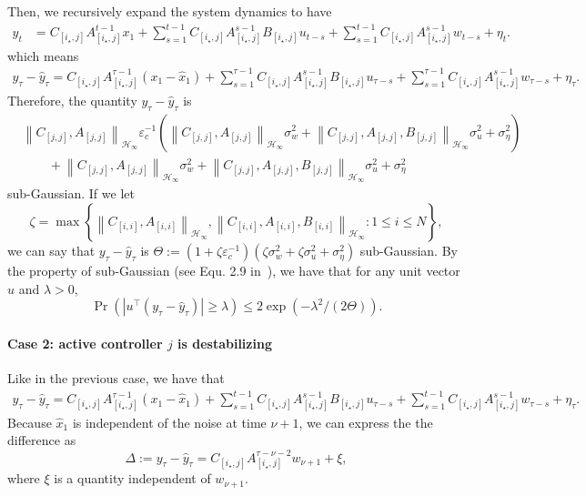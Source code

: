\documentclass[11pt, twoside]{article}
\theoremstyle{definition}
\newcommand{\norm}[1]{\left\lVert #1 \right\rVert}
\newcommand{\hinfnorm}[1]{\norm{#1}_{\mathcal{H}_\infty}}
\begin{document}
Then, we recursively expand the system dynamics to have
\begin{align*}
    y_t
    &= C_{[i_\star, j]} A_{[i_\star, j]}^{t-1} x_{1} + \sum_{s=1}^{t-1} C_{[i_\star, j]} A_{[i_\star, j]}^{s-1} B_{[i_\star, j]} u_{t-s} + \sum_{s=1}^{t-1} C_{[i_\star, j]} A_{[i_\star, j]}^{s-1} w_{t-s} + \eta_t.
\end{align*}
which means
\begin{align*} 
    y_{\tau} - \hat{y}_{\tau} = C_{[i_\star, j]} A_{[i_\star, j]}^{\tau-1} (x_{1} - \hat{x}_1) + \sum_{s=1}^{\tau-1} C_{[i_\star, j]} A_{[i_\star, j]}^{s-1} B_{[i_\star, j]} u_{\tau-s} + \sum_{s=1}^{\tau-1} C_{[i_\star, j]} A_{[i_\star, j]}^{s-1} w_{\tau-s} + \eta_\tau.
\end{align*}
Therefore, the quantity $y_{\tau} - \hat{y}_{\tau}$ is 
\begin{align*} 
    &\hinfnorm{C_{[j,j]}, A_{[j,j]}} \varepsilon_c^{-1}\left(\hinfnorm{C_{[j,j]}, A_{[j,j]}}\sigma_w^2 + \hinfnorm{C_{[j,j]}, A_{[j,j]}, B_{[j,j]}}\sigma_u^2 + \sigma_\eta^2\right) \\
    &\quad\quad+ \hinfnorm{C_{[j,j]}, A_{[j,j]}}\sigma_w^2 + \hinfnorm{C_{[j,j]}, A_{[j,j]}, B_{[j,j]}}\sigma_u^2 + \sigma_\eta^2
\end{align*}
sub-Gaussian.
If we let 
\[\zeta = \max \left\{\hinfnorm{C_{[i, i]}, A_{[i, i]}}, \hinfnorm{C_{[i, i]}, A_{[i, i]}, B_{[i, i]}} : 1 \le i \le N\right\},\]
we can say that $y_{\tau} - \hat{y}_{\tau}$ is
$\Theta:= (1 + \zeta \varepsilon_c^{-1})(\zeta \sigma_w^2 + \zeta \sigma_u^2 + \sigma_\eta^2)$
sub-Gaussian.
By the property of sub-Gaussian (see Equ. 2.9 in~\cite{wainwright2019high}), we have that for any unit vector $u$ and $\lambda > 0$, 
\begin{equation}
\label{equ:subgaussian-conc}
    \Pr(|u^\top(y_{\tau} - \hat{y}_{\tau})| \ge \lambda) \le 2 \exp(-\lambda^2/(2\Theta)).
\end{equation}



\paragraph{Case 2: active controller $j$ is destabilizing}
Like in the previous case, we have that
\begin{align*} 
    y_{\tau} - \hat{y}_{\tau} = C_{[i_\star, j]} A_{[i_\star, j]}^{\tau-1} (x_{1} - \hat{x}_1) + \sum_{s=1}^{t-1} C_{[i_\star, j]} A_{[i_\star, j]}^{s-1} B_{[i_\star, j]} u_{\tau-s} + \sum_{s=1}^{t-1} C_{[i_\star, j]} A_{[i_\star, j]}^{s-1} w_{\tau-s} + \eta_\tau.
\end{align*}
Because $\hat{x}_1$ is independent of the noise at time $\nu+1$, we can express the the difference as
\[\Delta := y_{\tau} - \hat{y}_{\tau} = C_{[i_\star, j]} A_{[i_\star, j]}^{\tau-\nu-2} w_{\nu+1} + \xi,\]
where $\xi$ is a quantity independent of $w_{\nu+1}$.
\end{document}
